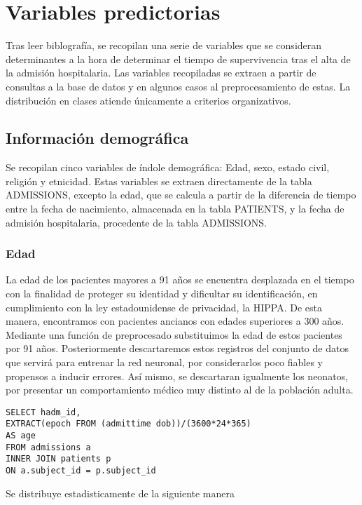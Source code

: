 \documentclass{report}
\begin{document}
\section{Variables predictorias}

Tras leer biblografía, se recopilan una serie de variables que se
consideran determinantes a la hora de determinar el tiempo de
supervivencia tras el alta de la admisión hospitalaria. Las variables recopiladas se extraen a partir de consultas a la base de
datos y en algunos casos al preprocesamiento de estas. La distribución en clases atiende únicamente a criterios organizativos. 

\subsection{Información demográfica}

Se recopilan cinco variables de índole demográfica: Edad, sexo, estado
civil, religión y etnicidad. Estas variables se extraen directamente de
la tabla ADMISSIONS, excepto la edad, que se calcula a partir de la
diferencia de tiempo entre la fecha de nacimiento, almacenada en la
tabla PATIENTS, y la fecha de admisión hospitalaria, procedente de la
tabla ADMISSIONS.

\subsubsection{Edad}

La edad de los pacientes mayores a 91 años se encuentra desplazada en el
tiempo con la finalidad de proteger su identidad y dificultar su
identificación, en cumplimiento con la ley estadounidense de privacidad,
la HIPPA. De esta manera, encontramos con pacientes ancianos con edades
superiores a 300 años. Mediante una función de preprocesado substituimos
la edad de estos pacientes por 91 años. Posteriormente descartaremos
estos registros del conjunto de datos que servirá para entrenar la red
neuronal, por considerarlos poco fiables y propensos a inducir errores.
Así mismo, se descartaran igualmente los neonatos, por presentar un
comportamiento médico muy distinto al de la población adulta.
\begin{verbatim}
SELECT hadm_id, 
EXTRACT(epoch FROM (admittime dob))/(3600*24*365)
AS age
FROM admissions a
INNER JOIN patients p
ON a.subject_id = p.subject_id
\end{verbatim}

Se distribuye estadisticamente de la siguiente manera
\end{document}
